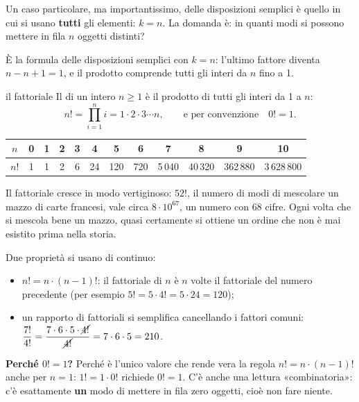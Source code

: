 Un caso particolare, ma importantissimo, delle disposizioni semplici è quello in cui si usano \textbf{tutti} gli
elementi: $k = n$. La domanda è: in quanti modi si possono mettere in fila $n$ oggetti distinti?



\begin{dimostrazione}
\passo{} È la formula delle disposizioni semplici con $k = n$: l'ultimo fattore diventa $n - n + 1 = 1$, e il prodotto
comprende tutti gli interi da $n$ fino a 1.
\end{dimostrazione}

\begin{richiamo}{il fattoriale}
Il  di un intero $n \geq 1$ è il prodotto di tutti gli interi da 1 a $n$:
\[ n! = \prod_{i=1}^{n} i = 1 \cdot 2 \cdot 3 \cdots n , \qquad \text{e per convenzione}\quad 0! = 1 . \]
\begin{center}
\renewcommand{\arraystretch}{1.2}
\begin{tabular}{@{}c|ccccccccccc@{}}
  $n$ & 0 & 1 & 2 & 3 & 4 & 5 & 6 & 7 & 8 & 9 & 10 \\ \hline
  $n!$ & 1 & 1 & 2 & 6 & 24 & 120 & 720 & 5\,040 & 40\,320 & 362\,880 & 3\,628\,800
\end{tabular}
\end{center}
Il fattoriale cresce in modo vertiginoso: $52!$, il numero di modi di mescolare un mazzo di carte francesi, vale circa
$8 \cdot 10^{67}$, un numero con 68 cifre. Ogni volta che si mescola bene un mazzo, quasi certamente si ottiene un
ordine che non è mai esistito prima nella storia.

Due proprietà si usano di continuo:
\begin{itemize}
  \item $n! = n \cdot (n-1)!$: il fattoriale di $n$ è $n$ volte il fattoriale del numero precedente (per esempio
        $5! = 5 \cdot 4! = 5 \cdot 24 = 120$);
  \item un rapporto di fattoriali si semplifica cancellando i fattori comuni:
        $\dfrac{7!}{4!} = \dfrac{7 \cdot 6 \cdot 5 \cdot \cancel{4!}}{\cancel{4!}} = 7 \cdot 6 \cdot 5 = 210$.
\end{itemize}
\textbf{Perché $0! = 1$?} Perché è l'unico valore che rende vera la regola $n! = n \cdot (n-1)!$ anche per $n = 1$:
$1! = 1 \cdot 0!$ richiede $0! = 1$. C'è anche una lettura «combinatoria»: c'è esattamente \textbf{un} modo di
mettere in fila zero oggetti, cioè non fare niente.
\end{richiamo}

